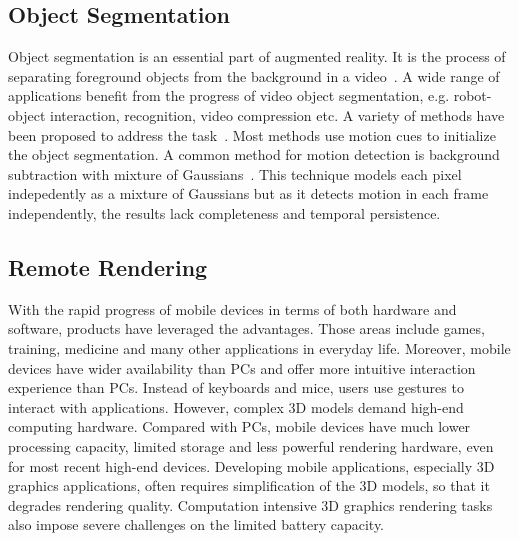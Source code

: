 \subsection{Object Segmentation}

Object segmentation is an essential part of augmented reality.
It is the process of separating foreground objects from the background in a video~\cite{papazoglou2013}. A wide range of applications benefit from the progress of video object segmentation, e.g. robot-object interaction, recognition, video compression etc.
%
A variety of methods have been proposed to address the task~\cite{papazoglou2013,ma2012,wang2015,brox2010,taylor2015}. Most methods use motion cues to initialize the object segmentation.
A common method for motion detection is  background subtraction with mixture of Gaussians~\cite{kaewtrakulpong2002,zivkovic2004}. This technique models each pixel indepedently as a mixture of Gaussians 
but as it detects motion in each frame independently, the results lack completeness and temporal persistence. 


\subsection{Remote Rendering}

With the rapid progress of mobile devices in terms of both hardware and software, products have leveraged the advantages. Those areas include games, training, medicine and many other applications in everyday life.
Moreover, mobile devices have wider availability than PCs and offer more intuitive interaction experience than PCs. Instead of keyboards and mice, users use gestures to interact with applications.
However, complex 3D models demand high-end computing hardware. Compared with PCs, mobile devices have much lower processing capacity, limited storage and less powerful rendering hardware, even for most recent high-end devices. Developing mobile applications, especially 3D graphics applications, often requires simplification of the 3D models, so that it degrades rendering quality.
Computation intensive 3D graphics rendering tasks also impose severe challenges on the limited battery capacity.

